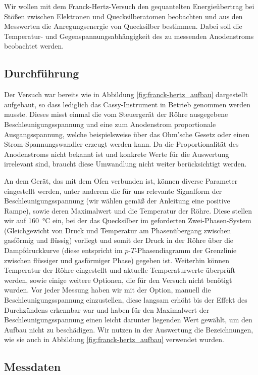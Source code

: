 \documentclass[11pt, a4paper]{article}
\begin{document}
Wir wollen mit dem Franck-Hertz-Versuch den gequantelten Energieübertrag bei Stößen zwischen Elektronen und Quecksilberatomen beobachten und aus den Messwerten die Anregungsenergie von Quecksilber bestimmen.
Dabei soll die Temperatur- und Gegenspannungsabhängigkeit des zu messenden Anodenstroms beobachtet werden.

\subsection{Durchführung}

Der Versuch war bereits  wie in Abbildung \ref{fig:franck-hertz_aufbau} dargestellt aufgebaut, so dass lediglich das Cassy-Instrument in Betrieb genommen werden musste.
Dieses misst einmal die vom Steuergerät der Röhre ausgegebene Beschleunigungsspannung und eine zum Anodenstrom proportionale Ausgangsspannung, welche beispielsweise über das Ohm'sche Gesetz oder einen Strom-Spannungswandler erzeugt werden kann.
Da die Proportionalität des Anodenstroms nicht bekannt ist und konkrete Werte für die Auswertung irrelevant sind, braucht diese Umwandlung nicht weiter berücksichtigt werden.

An dem Gerät, das mit dem Ofen verbunden ist, können diverse Parameter eingestellt werden, unter anderem die für uns relevante Signalform der Beschleunigungsspannung (wir wählen gemäß der Anleitung eine positive Rampe), sowie deren Maximalwert und die Temperatur der Röhre.
Diese stellen wir auf \SI{160}{\degreeCelsius} ein, bei der das Quecksilber im geforderten Zwei-Phasen-System (Gleichgewicht von Druck und Temperatur am Phasenübergang zwischen gasförmig und flüssig) vorliegt und somit der Druck in der Röhre über die Dampfdruckkurve (diese entspricht im $p$-$T$-Phasendiagramm der Grenzlinie zwischen flüssiger und gasförmiger Phase) gegeben ist.
Weiterhin können Temperatur der Röhre eingestellt und aktuelle Temperaturwerte überprüft werden, sowie einige weitere Optionen, die für den Versuch nicht benötigt wurden.
Vor jeder Messung haben wir mit der Option, manuell die Beschleunigungsspannung einzustellen, diese langsam erhöht bis der Effekt des Durchzündens erkennbar war und haben für den Maximalwert der Beschleunigungsspannung einen leicht darunter liegenden Wert gewählt, um den Aufbau nicht zu beschädigen.
Wir nutzen in der Auswertung die Bezeichnungen, wie sie auch in Abbildung \ref{fig:franck-hertz_aufbau} verwendet wurden.

\subsection{Messdaten}
\end{document}
